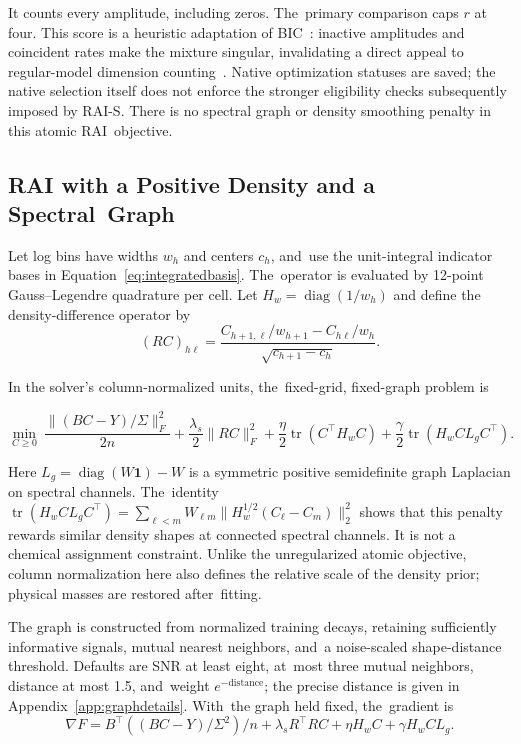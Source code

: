 \documentclass[mathematics,article,accept,moreauthors]{Definitions/mdpi}
\newcommand{\one}{\mathbf{1}}
\newcommand{\diag}{\operatorname{diag}}
\newcommand{\tr}{\operatorname{tr}}
\begin{document}
It counts every amplitude, including zeros. The~primary comparison caps $r$ at four. This score is a heuristic adaptation of BIC~\cite{schwarz}: inactive amplitudes and coincident rates make the mixture singular, invalidating a direct appeal to regular-model dimension counting~\cite{watanabe}. Native optimization statuses are saved; the native selection itself does not enforce the stronger eligibility checks subsequently imposed by RAI-S. There is no spectral graph or density smoothing penalty in this atomic RAI~objective.

\subsection{RAI with a Positive Density and a Spectral~Graph}\label{sec:raidensity}
Let log bins have widths $w_h$ and centers $c_h$, and~use the unit-integral indicator bases in Equation~\eqref{eq:integratedbasis}. The~operator is evaluated by 12-point Gauss--Legendre quadrature per cell. Let $H_w=\diag(1/w_h)$ and define the density-difference operator by
\begin{equation}\label{eq:rairough}
 (RC)_{h\ell}=\frac{C_{h+1,\ell}/w_{h+1}-C_{h\ell}/w_h}
 {\sqrt{c_{h+1}-c_h}}.
\end{equation}

In the solver's column-normalized units, the~fixed-grid, fixed-graph problem is

\begin{equation}\label{eq:raidensity}
 \min_{C\geq0}\ \frac{\|(BC-Y)/\Sigma\|_F^2}{2n}
 +\frac{\lambda_s}{2}\|RC\|_F^2
 +\frac{\eta}{2}\tr(C^\top H_wC)
 +\frac{\gamma}{2}\tr(H_w C L_g C^\top).
\end{equation}

Here $L_g=\diag(W\one)-W$ is a symmetric positive semidefinite graph Laplacian on spectral channels. The~identity $\tr(H_w C L_g C^\top)=\sum_{\ell<m}W_{\ell m}\|H_w^{1/2}(C_\ell-C_m)\|_2^2$ shows that this penalty rewards similar density shapes at connected spectral channels. It is not a chemical assignment constraint. Unlike the unregularized atomic objective, column normalization here also defines the relative scale of the density prior; physical masses are restored after~fitting.

The graph is constructed from normalized training decays, retaining sufficiently informative signals, mutual nearest neighbors, and~a noise-scaled shape-distance threshold. Defaults are SNR at least eight, at~most three mutual neighbors, distance at most 1.5, and~weight $e^{-\mathrm{distance}}$; the precise distance is given in Appendix~\ref{app:graphdetails}. With~the graph held fixed, the~gradient is
\begin{equation}\label{eq:raidensitygrad}
 \nabla F=B^\top((BC-Y)/\Sigma^2)/n
       +\lambda_sR^\top RC+\eta H_wC+\gamma H_w C L_g.
\end{equation}
\end{document}
